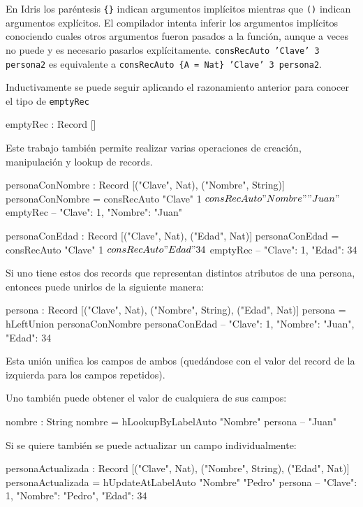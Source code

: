 En Idris los paréntesis \texttt{\{\}} indican argumentos implícitos mientras que \texttt{()} indican argumentos explícitos. El compilador intenta inferir los argumentos implícitos conociendo cuales otros argumentos fueron pasados a la función, aunque a veces no puede y es necesario pasarlos explícitamente. \texttt{consRecAuto 'Clave' 3 persona2} es equivalente a \texttt{consRecAuto \{A = Nat\} 'Clave' 3 persona2}.

Inductivamente se puede seguir aplicando el razonamiento anterior para conocer el tipo de \texttt{emptyRec}

\begin{code}
emptyRec : Record []
\end{code}

Este trabajo también permite realizar varias operaciones de creación, manipulación y lookup de records.

\begin{code}
personaConNombre : Record [("Clave", Nat), ("Nombre", String)]
personaConNombre = consRecAuto "Clave" 1 $
  consRecAuto "Nombre" "Juan" $
  emptyRec
-- { "Clave": 1, "Nombre": "Juan" }

personaConEdad : Record [("Clave", Nat), ("Edad", Nat)]
personaConEdad = consRecAuto "Clave" 1 $
  consRecAuto "Edad" 34 $
  emptyRec
-- { "Clave": 1, "Edad": 34 }
\end{code}

Si uno tiene estos dos records que representan distintos atributos de una persona, entonces puede unirlos de la siguiente manera:

\begin{code}
persona : Record [("Clave", Nat), ("Nombre", String), 
  ("Edad", Nat)]
persona = hLeftUnion personaConNombre personaConEdad
-- { "Clave": 1, "Nombre": "Juan", "Edad": 34 }
\end{code}

Esta unión unifica los campos de ambos (quedándose con el valor del record de la izquierda para los campos repetidos).

Uno también puede obtener el valor de cualquiera de sus campos:

\begin{code}
nombre : String
nombre = hLookupByLabelAuto "Nombre" persona
-- "Juan"
\end{code}

Si se quiere también se puede actualizar un campo individualmente:

\begin{code}
personaActualizada : Record [("Clave", Nat), ("Nombre", String), 
  ("Edad", Nat)]
personaActualizada = hUpdateAtLabelAuto "Nombre" "Pedro" persona
-- { "Clave": 1, "Nombre": "Pedro", "Edad": 34 }
\end{code}

